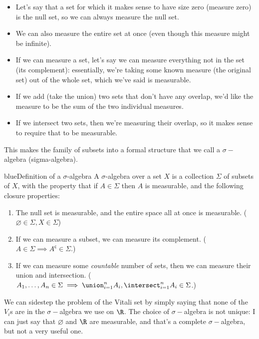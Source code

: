 \documentclass[./analysis.tex]{subfiles}
\begin{document}
    \begin{itemize}
        \item Let's say that a set for which it makes sense to have size zero (measure zero) is the null set, so we can always measure the null set.
        \item We can also measure the entire set at once (even though this measure might be infinite).
        \item If we can measure a set, let's say we can measure everything not in the set (its complement): essentially, we're taking some known measure (the original set) out of the whole set, which we've said is measurable.
        \item If we add (take the union) two sets that don't have any overlap, we'd like the measure to be the sum of the two individual measures. 
        \item If we intersect two sets, then we're measuring their overlap, so it makes sense to require that to be measurable.
    \end{itemize}
    
    This makes the family of subsets into a formal structure that we call a $\sigma-$algebra (sigma-algebra).

    \begin{mycolorbox}{blue}{Definition of a $\sigma$-algebra}
        A $\sigma$-algebra over a set $X$ is a collection $\Sigma$ of subsets of $X$, with the property that if $A \in \Sigma$ then $A$ is measurable, and the following closure properties:

        \begin{enumerate}
            \item The null set is measurable, and the entire space all at once is measurable. ($\varnothing \in \Sigma, X \in \Sigma$)
            \item If we can measure a subset, we can measure its complement. ($A \in \Sigma \implies A^{\mathsf{c}} \in \Sigma$.)
            \item If we can measure some \emph{countable} number of sets, then we can measure their union and intersection. ($A_1, \dots, A_n \in \Sigma \implies \union_{i=1}^n A_i, \intersect_{i=1}^n A_i \in \Sigma$.)
        \end{enumerate}
    \end{mycolorbox}

    We can sidestep the problem of the Vitali set by simply saying that none of the $V_i$s are in the $\sigma-$algebra we use on $\R$. The choice of $\sigma-$algebra is not unique: I can just say that $\varnothing$ and $\R$ are measurable, and that's a complete $\sigma-$algebra, but not a very useful one.
\end{document}
